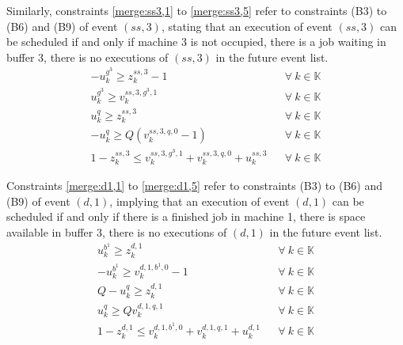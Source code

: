 \documentclass[suppldata]{interact}
\theoremstyle{plain}
\theoremstyle{definition}
\theoremstyle{remark}
\begin{document}
Similarly, constraints \eqref{merge:ss3,1} to \eqref{merge:ss3,5} refer to constraints (B3) to (B6) and (B9) of event ${(ss,3)}$, stating that an execution of event ${(ss,3)}$ can be scheduled if and only if machine 3 is not occupied, there is a job waiting in buffer 3, there is no executions of ${(ss,3)}$ in the future event list. 
\begin{eqnarray}
	-u^{g^3}_k\ge z^{ss,3}_k-1&& \forall\ k\in \mathbb{K}\label{merge:ss3,1}\\
	u^{g^3}_k\ge v^{ss,3,g^3,1}_k&& \forall\ k\in \mathbb{K}\label{merge:ss3,2}\\
	u^{q}_k\ge z^{ss,3}_k&& \forall\ k\in \mathbb{K}\label{merge:ss3,3}\\
	-u^{q}_k \ge Q(v^{ss,3,q,0}_k-1)&& \forall\ k\in \mathbb{K}\label{merge:ss3,4}\\
	1-z^{ss,3}_k\le v^{ss,3,g^3,1}_k+v^{ss,3,q,0}_k+u^{ss,3}_k&& \forall\ k\in \mathbb{K}\label{merge:ss3,5}
\end{eqnarray}

Constraints \eqref{merge:d1,1} to \eqref{merge:d1,5} refer to constraints (B3) to (B6) and (B9) of event ${(d,1)}$, implying that an execution of event ${(d,1)}$ can be scheduled if and only if there is a finished job in machine 1, there is space available in buffer 3, there is no executions of ${(d,1)}$ in the future event list. 
\begin{eqnarray}
	u^{b^1}_k\ge z^{d,1}_k&& \forall\ k\in \mathbb{K}\label{merge:d1,1}\\
	-u^{b^1}_k\ge v^{d,1,b^1,0}_k-1&& \forall\ k\in \mathbb{K}\label{merge:d1,2}\\
	Q-u^{q}_k\ge z^{d,1}_k&& \forall\ k\in \mathbb{K}\label{merge:d1,3}\\
	u^{q}_k\ge Qv^{d,1,q,1}_k&& \forall\ k\in \mathbb{K}\label{merge:d1,4}\\
	1-z^{d,1}_k\le v^{d,1,b^1,0}_k+v^{d,1,q,1}_k+u^{d,1}_k&& \forall\ k\in \mathbb{K}\label{merge:d1,5}
\end{eqnarray}
\end{document}
